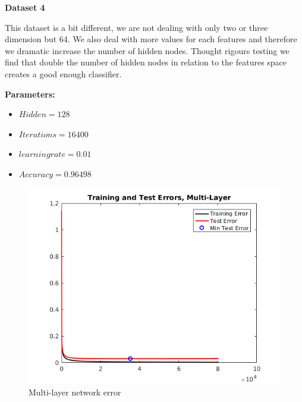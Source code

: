 \documentclass[a4paper,12pt]{article}
\begin{document}
\noindent \textbf{Dataset 4}

This dataset is a bit different, we are not dealing with only two or three dimension but 64. We also deal with more values for each features and therefore we dramatic increase the number of hidden nodes. Thought rigours testing we find that double the number of hidden nodes in relation to the features space creates a good enough classifier.

\textbf{Parameters:}
\begin{itemize}
\item $Hidden = 128$
\item $Iterations = 16400$
\item $learning rate = 0.01$
\item $Accuracy = 0.96498$
\end{itemize}

\begin{figure}[H]
\centering
  \begin{minipage}[]{1\textwidth}
  \caption{Multi-layer network error}\label{fig:multi_4_error}
  \includegraphics[width=\textwidth]{figures/multi_4_error.png}
  \end{minipage}
\end{figure}
\end{document}
